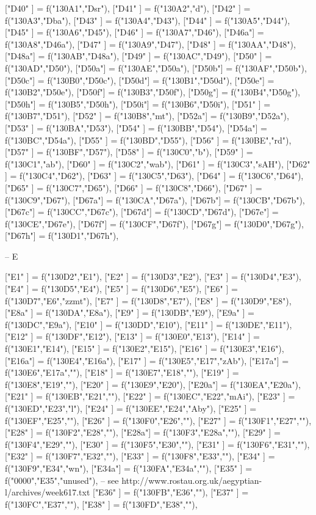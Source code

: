{["D40" ]  = f("130A1","Dsr"),
["D41" ]  = f("130A2","d"),
["D42" ]  = f("130A3","Dba"),
["D43" ]  = f("130A4","D43"),
["D44" ]  = f("130A5","D44"),
["D45" ]  = f("130A6","D45"),
["D46" ]  = f("130A7","D46"),
["D46a"]  = f("130A8","D46a"),
["D47" ]  = f("130A9","D47"),
["D48" ]  = f("130AA","D48"),
["D48a"]  = f("130AB","D48a"),
["D49" ]  = f("130AC","D49"),
["D50" ]  = f("130AD","D50"),
["D50a"]  = f("130AE","D50a"),
["D50b"]  = f("130AF","D50b"),
["D50c"]  = f("130B0","D50c"),
["D50d"]  = f("130B1","D50d"),
["D50e"]  = f("130B2","D50e"),
["D50f"]  = f("130B3","D50f"),
["D50g"]  = f("130B4","D50g"),
["D50h"]  = f("130B5","D50h"),
["D50i"]  = f("130B6","D50i"),
["D51" ]  = f("130B7","D51"),
["D52" ]  = f("130B8","mt"),
["D52a"]  = f("130B9","D52a"),
["D53" ]  = f("130BA","D53"),
["D54" ]  = f("130BB","D54"),
["D54a"]  = f("130BC","D54a"),
["D55" ]  = f("130BD","D55"),
["D56" ]  = f("130BE","rd"),
["D57" ]  = f("130BF","D57"),
["D58" ]  = f("130C0","b"),
["D59" ]  = f("130C1","ab"),
["D60" ]  = f("130C2","wab"),
["D61" ]  = f("130C3","sAH"),
["D62" ]  = f("130C4","D62"),
["D63" ]  = f("130C5","D63"),
["D64" ]  = f("130C6","D64"),
["D65" ]  = f("130C7","D65"),
["D66" ]  = f("130C8","D66"),
["D67" ]  = f("130C9","D67"),
["D67a"]  = f("130CA","D67a"),
["D67b"]  = f("130CB","D67b"),
["D67c"]  = f("130CC","D67c"),
["D67d"]  = f("130CD","D67d"),
["D67e"]  = f("130CE","D67e"),
["D67f"]  = f("130CF","D67f"),
["D67g"]  = f("130D0","D67g"),
["D67h"]  = f("130D1","D67h"),

-- E

    ["E1"  ]  = f("130D2","E1"),
    ["E2"  ]  = f("130D3","E2"),
    ["E3"  ]  = f("130D4","E3"),
    ["E4"  ]  = f("130D5","E4"),
    ["E5"  ]  = f("130D6","E5"),
    ["E6"  ]        = f("130D7","E6","zzmt"),
    ["E7"  ]        = f("130D8","E7"),
    ["E8"  ]  = f("130D9","E8"),
    ["E8a" ]      = f("130DA","E8a"),
    ["E9"  ]  = f("130DB","E9"),
    ["E9a" ]  = f("130DC","E9a"),
    ["E10" ]  = f("130DD","E10"),
["E11" ]  = f("130DE","E11"),
["E12" ]  = f("130DF","E12"),
["E13" ]  = f("130E0","E13"),
["E14" ]  = f("130E1","E14"),
["E15" ]  = f("130E2","E15"),
["E16" ]  = f("130E3","E16"),
["E16a"]  = f("130E4","E16a"),
["E17" ]  = f("130E5","E17","zAb"),
["E17a"]  = f("130E6","E17a",""),
["E18" ]  = f("130E7","E18",""),
["E19" ]  = f("130E8","E19",""),
["E20" ]  = f("130E9","E20"),
["E20a"]  = f("130EA","E20a"),
["E21" ]  = f("130EB","E21",""),
["E22" ]  = f("130EC","E22","mAi"),
["E23" ]  = f("130ED","E23","l"),
["E24" ]  = f("130EE","E24","Aby"),
["E25" ]  = f("130EF","E25",""),
["E26" ]  = f("130F0","E26",""),
["E27" ]  = f("130F1","E27",""),
["E28" ]  = f("130F2","E28",""),
["E28a"]  = f("130F3","E28a",""),
["E29" ]  = f("130F4","E29",""),
["E30" ]  = f("130F5","E30",""),
["E31" ]  = f("130F6","E31",""),
["E32" ]  = f("130F7","E32",""),
["E33" ]  = f("130F8","E33",""),
["E34" ]  = f("130F9","E34","wn"),
["E34a"]  = f("130FA","E34a",""),
["E35" ]  = f("0000","E35","unused"), -- see http://www.rostau.org.uk/aegyptian-l/archives/week617.txt
["E36" ]  = f("130FB","E36",""),
["E37" ]  = f("130FC","E37",""),
["E38" ]  = f("130FD","E38",""),

}
